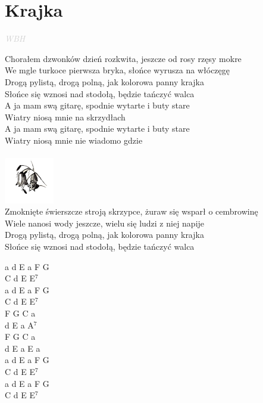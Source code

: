 \documentclass[a5paper, 10pt]{book}
\begin{document}
\section{Krajka}\textcolor{lightgray}{\textit{WBH}}\vspace*{2mm}\\
\begin{minipage}[t]{0.87\textwidth}
  Chorałem dzwonków dzień rozkwita, jeszcze od rosy rzęsy mokre \\
  We mgle turkoce pierwsza bryka, słońce wyrusza na włóczęgę\\
  Drogą pylistą, drogą polną, jak kolorowa panny krajka\\
  Słońce się wznosi nad stodołą, będzie tańczyć walca\\

  \hspace*{5mm}A ja mam swą gitarę, spodnie wytarte i buty stare\\
  \hspace*{5mm}Wiatry niosą mnie na skrzydłach\\
  \hspace*{5mm}A ja mam swą gitarę, spodnie wytarte i buty stare\\
  \hspace*{5mm}Wiatry niosą mnie nie wiadomo gdzie\\
  \vspace*{5mm}\\
  \includegraphics[height=2cm, right]{images/krajka.png}\vspace*{-2.55cm}\\
  Zmoknięte świerszcze stroją skrzypce, żuraw się wsparł o cembrowinę\\
  Wiele nanosi wody jeszcze, wielu się ludzi z niej napije\\
  Drogą pylistą, drogą polną, jak kolorowa panny krajka\\
  Słońce się wznosi nad stodołą, będzie tańczyć walca\\
\end{minipage}
\begin{minipage}[t]{0.13\textwidth}
  a d E a F G\\
  C d E E$^7$\\
  a d E a F G\\
  C d E E$^7$\\

  F G C a\\
  d E a A$^7$\\
  F G C a\\
  d E a E a\\

  a d E a F G\\
  C d E E$^7$\\
  a d E a F G\\
  C d E E$^7$\\
\end{minipage}
\end{document}
